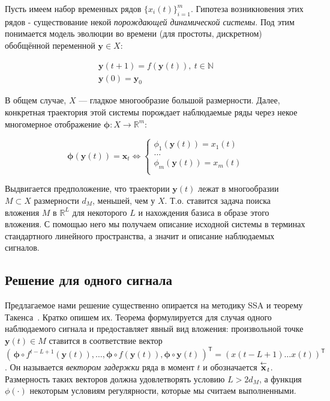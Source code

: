 		 Пусть имеем набор временных рядов $ \{x_i(t)\}_{i=1}^m $. Гипотеза возникновения этих рядов - существование некой \emph{порождающей динамической системы}. Под этим понимается модель эволюции во времени (для простоты, дискретном) обобщённой переменной $ \mathbf{y} \in X $:
		 	
		 \begin{gather*}
		 	\mathbf{y}(t + 1) = f(\mathbf{y}(t)), \ t \in \mathbb{N} \\
		 	\mathbf{y}(0) = \mathbf{y}_0
		 \end{gather*}
		 	
		 В общем случае, $ X $ --- гладкое многообразие большой размерности. Далее, конкретная траектория этой системы порождает наблюдаемые ряды через некое многомерное отображение $ \boldsymbol{\phi}: X \to \mathbb{R}^m $:
		 	
		 \begin{equation*}
		 	\boldsymbol{\phi}(\mathbf{y}(t)) = \mathbf{x}_t \Leftrightarrow \begin{cases}
		 		\phi_1(\mathbf{y}(t)) = x_1(t) \\
		 		\ldots \\
		 		\phi_m(\mathbf{y}(t)) = x_m(t) \\
		 	\end{cases}
		 \end{equation*}
		 	
		 Выдвигается предположение, что траектории $ \mathbf{y}(t) $ лежат в многообразии $ M \subset X $ размерности  $ d_M $, меньшей, чем у $ X $. Т.о. ставится задача поиска вложения $ M $ в $ \mathbb{R}^{L} $ для некоторого $ L $ и нахождения базиса в образе этого вложения. С помощью него мы получаем описание исходной системы в терминах стандартного линейного пространства, а значит и описание наблюдаемых сигналов.
		 
		 \subsection*{Решение для одного сигнала}
		 
		 	Предлагаемое нами решение существенно опирается на методику SSA и теорему Такенса~\cite{citeulike:2735031}. Кратко опишем их. Теорема формулируется для случая одного наблюдаемого сигнала и предоставляет явный вид вложения: произвольной точке $ \mathbf{y}(t) \in M $ ставится в соответствие вектор $ ( \, \boldsymbol{\phi} \circ f^{t - L + 1}(\mathbf{y}(t)), \ldots , \boldsymbol{\phi} \circ f(\mathbf{y}(t)), \boldsymbol{\phi} \circ \mathbf{y}(t) \,)^{\mathsf{T}} = (x(t - L + 1) \ldots x(t))^{\mathsf{T}} $. Он называется \emph{вектором задержки} ряда в момент $ t $ и обозначается $ \overset{\leftarrow}{\mathbf{x}}_{t} $. Размерность таких векторов должна удовлетворять условию $ L > 2 d_M $, а функция $ \phi(\cdot) $ некоторым условиям регулярности, которые мы считаем выполненными.
		 	
